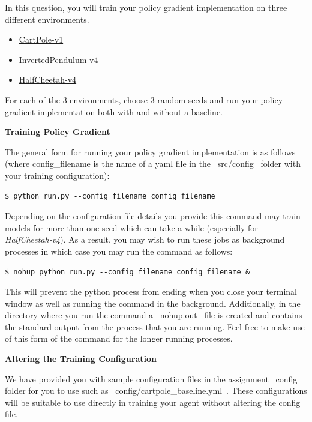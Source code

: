 \item {}

In this question, you will train your policy gradient implementation on three different environments.

\begin{itemize}
	\item \href{https://www.gymlibrary.dev/environments/classic_control/cart_pole/}{CartPole-v1}
	\item \href{https://www.gymlibrary.dev/environments/mujoco/inverted_pendulum/}{InvertedPendulum-v4}
	\item \href{https://www.gymlibrary.dev/environments/mujoco/half_cheetah/}{HalfCheetah-v4}
\end{itemize}

For each of the 3 environments, choose 3 random seeds and run your policy gradient implementation both with and without a baseline.

\clearpage
\textbf{Training Policy Gradient}

The general form for running your policy gradient implementation is as follows (where config\_filename is the name of a yaml file in the ~src/config~ folder with your training configuration):

\begin{lstlisting}
$ python run.py --config_filename config_filename
\end{lstlisting}

Depending on the configuration file details you provide this command may train models for more than one seed which can take a while (especially for \textit{HalfCheetah-v4}). As a result, you may wish to run these jobs as background processes in which case you may run the command as follows:

\begin{lstlisting}
$ nohup python run.py --config_filename config_filename &
\end{lstlisting}

This will prevent the python process from ending when you close your terminal window as well as running the command in the background. Additionally, in the directory where you run the command a ~nohup.out~ file is created and contains the standard output from the process that you are running. Feel free to make use of this form of the command for the longer running processes.

\textbf{Altering the Training Configuration}

We have provided you with sample configuration files in the assignment ~config~ folder for you to use such as ~config/cartpole_baseline.yml~. These configurations will be suitable to use directly in training your agent without altering the config file.

